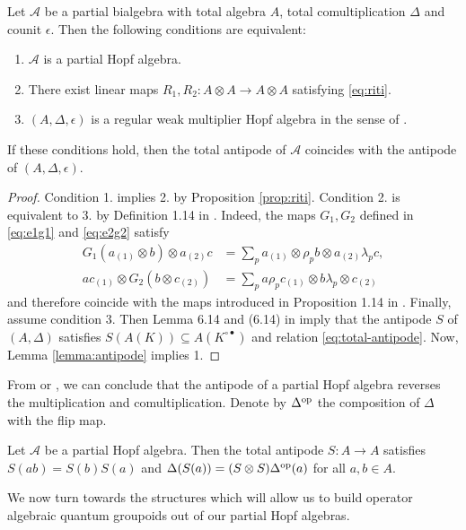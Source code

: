\begin{Theorem}  \label{theorem:partial-hopf-algebra}
  Let $\mathscr{A}$ be a partial bialgebra with total algebra $A$,
  total comultiplication $\Delta$ and counit $\epsilon$. Then the
  following conditions are equivalent:
  \begin{enumerate}
  \item $\mathscr{A}$ is a partial Hopf algebra.
  \item There exist linear maps $R_{1},R_{2} \colon A\otimes A\to
    A\otimes A$ satisfying  \eqref{eq:riti}.
  \item $(A,\Delta,\epsilon)$  is a regular weak multiplier Hopf algebra in the sense of \cite{}.
  \end{enumerate}
  If these conditions hold, then the total  antipode of $\mathscr{A}$ coincides with the antipode of $(A,\Delta,\epsilon)$.
\end{Theorem}
\begin{proof}
Condition 1.{} implies 2.{} by Proposition \ref{prop:riti}. Condition 2.{} is equivalent to 3.{} by Definition
1.14 in \cite{VDW1}. Indeed, the maps $G_{1},G_{2}$ defined in \eqref{eq:e1g1} and \eqref{eq:e2g2} satisfy
\begin{align*}
  G_{1}(a_{(1)} \otimes b) \otimes a_{(2)}c &= \sum_{p} a_{(1)} \otimes \rho_{p}b
  \otimes a_{(2)}\lambda_{p}c, \\
  ac_{(1)} \otimes G_{2}(b\otimes c_{(2)}) &=\sum_{p} a\rho_{p}c_{(1)} \otimes b\lambda_{p} \otimes c_{(2)}
\end{align*}
and therefore coincide with the maps introduced in Proposition 1.14 in
\cite{VDW1}.  Finally, assume condition 3. Then
 Lemma 6.14 and  (6.14) in \cite{Boh1} imply that the antipode
$S$ of $(A,\Delta)$ satisfies $S(A(K))\subseteq A(K^{\circ\bullet})$ and relation \eqref{eq:total-antipode}.  Now, Lemma \ref{lemma:antipode} implies 1.
\end{proof}

From \cite[Proposition 3.5 and Proposition 3.7]{VDW1} or \cite[Theorem
6.12 and Corollary 6.16]{Boh1}, we can conclude that the antipode of a
partial Hopf algebra reverses the multiplication and
comultiplication. Denote by $\Delta^{\operatorname{\mathrm{op}}}$ the composition of
$\Delta$ with the flip map.

\begin{Cor}
Let $\mathscr{A}$ be a partial Hopf algebra. Then the total antipode
$S:A\rightarrow A$ satisfies
$S(ab) = S(b)S(a)$ and $\Delta(S(a)) = (S\otimes S)\Delta^{\operatorname{\mathrm{op}}}(a)$
for all $a,b\in A$.
\end{Cor} 
We now turn towards the structures which will allow us to build operator algebraic quantum groupoids out of our partial Hopf algebras.

